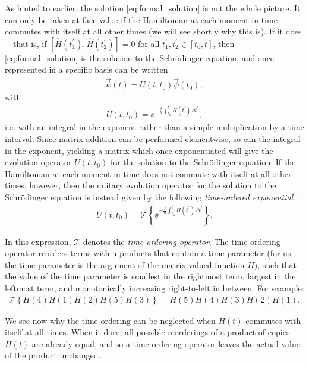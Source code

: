As hinted to earlier, the solution \eqref{eq:formal_solution} is not the whole picture. It can only be taken at face value if the Hamiltonian at each moment in time commutes with itself at all other times (we will see shortly why this is). If it does---that is, if $[\hat H(t_1^\prime), \hat H(t_2^\prime)] = 0$ for all $t^\prime_1, t^\prime_2 \in [t_0, t]$, then \eqref{eq:formal_solution} is the solution to the Schr\"odinger equation, and once represented in a specific basis can be written
\begin{align}
\vec \psi(t) = U(t, t_0) \vec \psi(t_0),
\end{align}
with
\begin{align}
U(t, t_0) = \ee^{-\frac \ii \hbar \int_{t_0}^t H(t^\prime)\,\dd t^\prime},
\end{align}
i.e. with an integral in the exponent rather than a simple multiplication by a time interval. Since matrix addition can be performed elementwise, so can the integral in the exponent, yielding a matrix which once exponentiated will give the evolution operator $U(t, t_0)$ for the solution to the Schr\"odinger equation. If the Hamiltonian at each moment in time does not commute with itself at all other times, however, then the unitary evolution operator for the solution to the Schr\"odinger equation is instead given by the following \emph{time-ordered exponential} \cite[p.~193]{tannor_introduction_2007}:
\begin{align}\label{eq:time_ordered_exponential}
U(t, t_0) = \mathcal{T}\left\{\ee^{-\frac \ii \hbar \int_{t_0}^t H(t^\prime)\,\dd t^\prime}\right\}.
\end{align}

In this expression, $\mathcal{T}$ denotes the \emph{time-ordering operator}. The time ordering operator reorders terms within products that contain a time parameter (for us, the time parameter is the argument of the matrix-valued function $H$), such that the value of the time parameter is smallest in the rightmost term, largest in the leftmost term, and monotonically increasing right-to-left in between. For example:
\begin{align}
\mathcal{T}\left\{H(4)H(1)H(2)H(5)H(3)\right\} = H(5)H(4)H(3)H(2)H(1).
\end{align}

We see now why the time-ordering can be neglected when $H(t)$ commutes with itself at all times. When it does, all possible reorderings of a product of copies $H(t)$ are already equal, and so a time-ordering operator leaves the actual value of the product unchanged.

